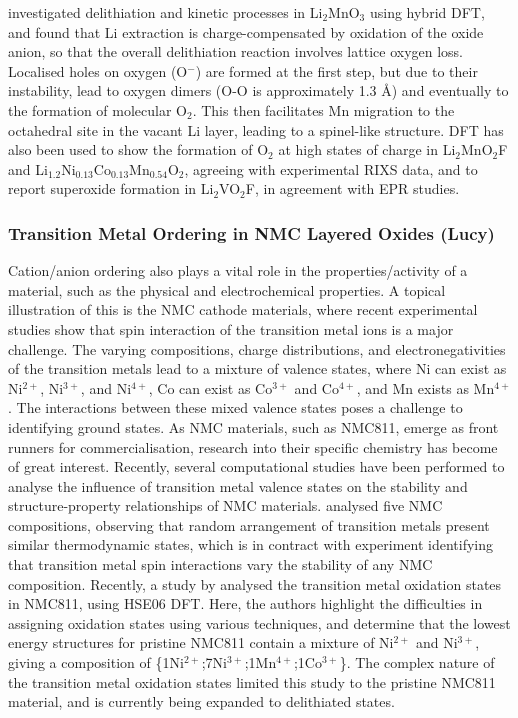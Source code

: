 \documentclass[../main.tex]{subfiles}
\begin{document}
\citeauthor{Chen2016} investigated delithiation and kinetic processes in Li$_2$MnO$_3$ using hybrid DFT, and found that Li extraction is charge-compensated by oxidation of the oxide anion, so that the overall delithiation reaction involves lattice oxygen loss.\cite{Chen2016} Localised holes on oxygen (O$^-$) are formed at the first step, but due to their instability, lead to oxygen dimers (O-O is approximately 1.3 \AA) and eventually to the formation of molecular O$_2$. This then facilitates Mn migration to the octahedral site in the vacant Li layer, leading to a spinel-like structure. DFT has also been used to show the formation of O$_2$ at high states of charge in Li$_2$MnO$_2$F\cite{Sharpe2020} and Li$_{1.2}$Ni$_{0.13}$Co$_{0.13}$Mn$_{0.54}$O$_2$, \cite{House2020a} agreeing with experimental RIXS data, and to report superoxide formation in Li$_2$VO$_2$F, in agreement with EPR studies.\cite{Chang2020}

\subsubsection{Transition Metal Ordering in NMC Layered Oxides (Lucy)}
\label{sec:TM_ordering_NMC}
Cation/anion ordering also plays a vital role in the properties/activity of a material, such as the physical and electrochemical properties. A topical illustration of this is the NMC cathode materials, where recent experimental studies show that spin interaction of the transition metal ions is a major challenge. \cite{duan2019insights, xiao2018insight} The varying compositions, charge distributions, and electronegativities of the transition metals lead to a mixture of valence states, where Ni can exist as Ni$^{2+}$, Ni$^{3+}$, and Ni$^{4+}$, Co can exist as Co$^{3+}$ and Co$^{4+}$, and Mn exists as Mn$^{4+}$. \cite{xiao2018insight} The interactions between these mixed valence states poses a challenge to identifying ground states. As NMC materials, such as NMC811, emerge as front runners for commercialisation, research into their specific chemistry has become of great interest. Recently, several computational studies have been performed to analyse the influence of transition metal valence states on the stability and structure-property relationships of NMC materials. \cite{sun2017electronic,dixit2017origin, hoang2016defect,dixit2017unraveling} \citeauthor{sun2017electronic} analysed five NMC compositions, observing that random arrangement of transition metals present similar thermodynamic states, which is in contract with experiment identifying that transition metal spin interactions vary the stability of any NMC composition. \cite{sun2017electronic}  Recently, a study by \citeauthor{rana} analysed the transition metal oxidation states in NMC811, using HSE06 DFT. Here, the authors highlight the difficulties in assigning oxidation states using various techniques, and determine that the lowest energy structures for pristine NMC811 contain a mixture of Ni$^{2+}$ and Ni$^{3+}$, giving a composition of \{1Ni$^{2+}$;7Ni$^{3+}$;1Mn$^{4+}$;1Co$^{3+}$\}. \cite{rana} The complex nature of the transition metal oxidation states limited this study to the pristine NMC811 material, and is currently being expanded to delithiated states.
\end{document}
